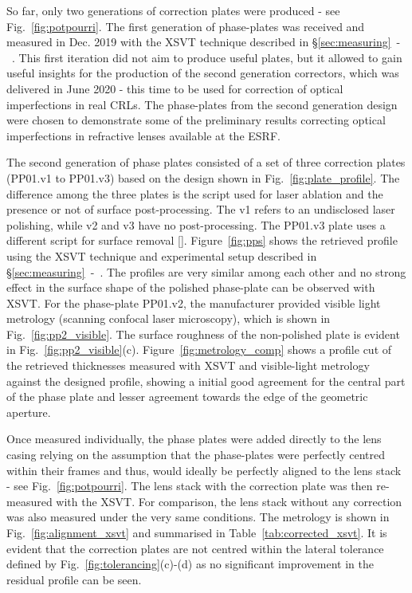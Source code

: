 \begin{refsection}
So far, only two generations of correction plates were produced - see Fig.~\ref{fig:potpourri}. The first generation of phase-plates was received and measured in Dec. 2019 with the XSVT technique described in \S\ref{sec:measuring}~-~\textit{}. This first iteration did not aim to produce useful plates, but it allowed to gain useful insights for the production of the second generation correctors, which was delivered in June 2020 - this time to be used for correction of optical imperfections in real CRLs. The phase-plates from the second generation design were chosen to demonstrate some of the preliminary results correcting optical imperfections in refractive lenses available at the ESRF.

The second generation of phase plates consisted of a set of three correction plates (PP01.v1 to PP01.v3) based on the design shown in Fig.~\ref{fig:plate_profile}. The difference among the three plates is the script used for laser ablation and the presence or not of surface post-processing. The v1 refers to an undisclosed laser polishing, while v2 and v3 have no post-processing. The PP01.v3 plate uses a different script for surface removal [\cite{Antipov2020}]. Figure~\ref{fig:pps} shows the retrieved profile using the XSVT technique and experimental setup described in \S\ref{sec:measuring}~-~\textit{}. The profiles are very similar among each other and no strong effect in the surface shape of the polished phase-plate can be observed with XSVT. For the phase-plate PP01.v2, the manufacturer provided visible light metrology (scanning confocal laser microscopy), which is shown in Fig.~\ref{fig:pp2_visible}. The surface roughness of the non-polished plate is evident in Fig.~\ref{fig:pp2_visible}(c). Figure~\ref{fig:metrology_comp} shows a profile cut of the retrieved thicknesses measured with XSVT and visible-light metrology against the designed profile, showing a initial good agreement for the central part of the phase plate and lesser agreement towards the edge of the geometric aperture.  

Once measured individually, the phase plates were added directly to the lens casing relying on the assumption that the phase-plates were perfectly centred within their frames and thus, would ideally be perfectly aligned to the lens stack - see Fig.~\ref{fig:potpourri}. The lens stack with the correction plate was then re-measured with the XSVT. For comparison, the lens stack without any correction was also measured under the very same conditions. The metrology is shown in Fig.~\ref{fig:alignment_xsvt} and summarised in Table~\ref{tab:corrected_xsvt}. It is evident that the correction plates are not centred within the lateral tolerance defined by Fig.~\ref{fig:tolerancing}(c)-(d) as no significant improvement in the residual profile can be seen.


\end{refsection}
